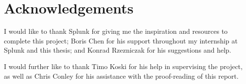 \chapter*{Acknowledgements}

I would like to thank Splunk for giving me the inspiration and resources to complete this project; Boris Chen for his support throughout my internship at Splunk and this thesis; and Konrad Rzezniczak for his suggestions and help.

I would further like to thank Timo Koski for his help in supervising the project, as well as Chris Conley for his assistance with the proof-reading of this report.
